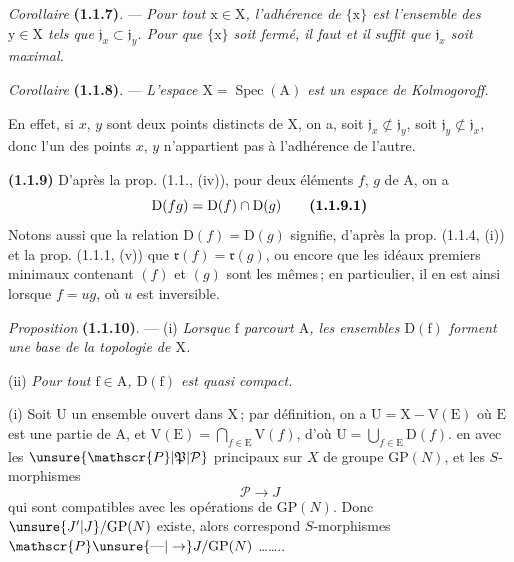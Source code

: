 \textit{Corollaire} \textbf{(1.1.7)}. --- \textit{Pour tout $\mathrm{x}\in \mathrm{X}$, l’adhérence de $\{\mathrm{x}\}$ est l’ensemble des $\mathrm{y}\in \mathrm{X}$ tels que $\mathfrak{j}_x\subset\mathfrak{j}_y$. Pour que $\{\mathrm{x}\}$ soit fermé, il faut et il suffit que $\mathfrak{j}_x$ soit maximal.}

\textit{Corollaire} \textbf{(1.1.8)}. --- \textit{L’espace $\mathrm{X}=\operatorname{Spec}(\mathrm{A})$ est un espace de Kolmogoroff.}

En effet, si $x$, $y$ sont deux points distincts de $\mathrm{X}$, on a, soit $\mathfrak{j}_x\not\subset\mathfrak{j}_y$, soit $\mathfrak{j}_y\not\subset\mathfrak{j}_x$, donc l’un des points $x$, $y$ n’appartient pas à l’adhérence de l’autre.

\textbf{(1.1.9)} D’après la prop. (1.1., (iv)), pour deux éléments $f$, $g$ de $\mathrm{A}$, on a
\[
\mathrm{D}(fg)=\mathrm{D}(f)\cap \mathrm{D}(g)
\tag*{\textbf{(1.1.9.1)}}
\]
Notons aussi que la relation $\mathrm{D}(f)=\mathrm{D}(g)$ signifie, d’après la prop. (1.1.4, (i)) et la prop. (1.1.1, (v)) que $\mathfrak{r}(f)=\mathfrak{r}(g)$, ou encore que les idéaux premiers minimaux contenant $(f)$ et $(g)$ sont les mêmes\,; en particulier, il en est ainsi lorsque $f=ug$, où $u$ est inversible.

\textit{Proposition} \textbf{(1.1.10)}. --- (i) \textit{Lorsque $\mathrm{f}$ parcourt $\mathrm{A}$, les ensembles $\mathrm{D}(\mathrm{f})$ forment une base de la topologie de $\mathrm{X}$.}

(ii) \textit{Pour tout $\mathrm{f}\in \mathrm{A}$, $\mathrm{D}(\mathrm{f})$ est quasi compact.} 

(i) Soit $\mathrm{U}$ un ensemble ouvert dans $\mathrm{X}$\,; par définition, on a $\mathrm{U}=\mathrm{X}-\mathrm{V}(\mathrm{E})$ où $\mathrm{E}$ est une partie de $\mathrm{A}$, et $\mathrm{V}(\mathrm{E})=\bigcap_{f\in \mathrm{E}}\mathrm{V}(f)$, d’où $\mathrm{U}=\bigcup_{f\in \mathrm{E}}\mathrm{D}(f)$.
\endgroup
en  avec les $\unsure{\mathscr{P}|\mathfrak{P}|\mathcal{P}}$ principaux sur $X$ de groupe $\mathrm{GP}(N)$, et les $S$-morphismes
\[
\mathscr{P}\longrightarrow J
\]
qui sont compatibles avec les opérations de $\mathrm{GP}(N)$.
Donc   $\unsure{J'|J}/\mathrm{GP}(N)$ existe, alors correspond  $S$-morphismes $\mathscr{P}\unsure{\text{---}|\to} J/\mathrm{GP}(N)$ \ldots\ldots..

